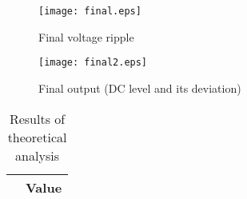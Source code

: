 \begin{figure}[h] \centering
  \begin{minipage}{.5\textwidth}
    \texttt{[image: final.eps]}
    \caption{Final voltage ripple}
    \label{fig:simenv}
    \end{minipage}%
  \begin{minipage}{.5\textwidth}
  \centering
    \texttt{[image: final2.eps]}
    \caption{Final output (DC level and its deviation)}
    \label{fig:compenv}
      \end{minipage}%
\end{figure}



\begin{table}[h]
  \centering
  \begin{tabular}{|c|c|}
    \hline    
     & { Value} \\ \hline
    
 \end{tabular}
 \caption{Results of theoretical analysis}
  \label{tab:op2}
\end{table}
